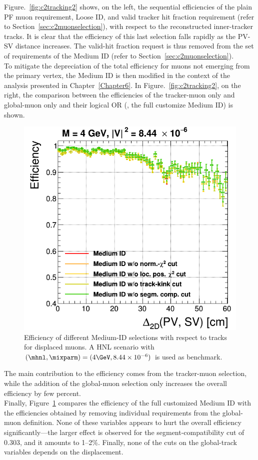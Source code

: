 Figure.~\ref{fig:c2tracking2} shows, on the left, the sequential
efficiencies of the plain PF muon requirement,
Loose ID, and
valid tracker hit fraction requirement (refer to
Section~\ref{sec:c2muonselection}), with respect to the reconstructed inner-tracker tracks. It is clear that the efficiency of
this last
 selection 
falls rapidly as the PV-SV
distance increases. 
The valid-hit fraction request is thus removed from the set of
requirements of the Medium ID (refer to
Section~\ref{sec:c2muonselection}). \\
To mitigate the depreciation of the
total efficiency for muons not emerging from the primary vertex, the
Medium ID is then modified in the context of the analysis presented in
Chapter~\ref{Chapter6}. 
In Figure.~\ref{fig:c2tracking2}, on the
right, 
the comparison between the efficiencies of the
tracker-muon only and global-muon only and their logical OR (\ie, the full
customize Medium ID) is shown.
\begin{figure}
\centering
\includegraphics[width=.4\textwidth]{Figures/c6/object/globalTrack_cuts_M-4_V-0p00290516780927_rho.png}
  \caption{Efficiency of different Medium-ID selections with respect to tracks for displaced
muons. A HNL scenario with
    $(\mhnl,\mixparm)=(4\GeV,8.44\times10^{-6})$ is used as
    benchmark. \dani}
  \label{fig:c2tracking3}
\end{figure} 
 The main contribution to the efficiency comes
from the tracker-muon selection, while the addition of the global-muon
selection only increases the overall efficiency by few percent.\\
Finally, Figure~\ref{fig:c2tracking3} compares the efficiency of
the full customized Medium ID with the efficiencies obtained by removing
individual requirements from the global-muon definition. None of these variables
appears to hurt the overall efficiency significantly---the larger
effect is observed for the segment-compatibility cut of 0.303, and it
amounts to 1--2\%. Finally, none of the cuts on the global-track
variables depends on the displacement.\\

